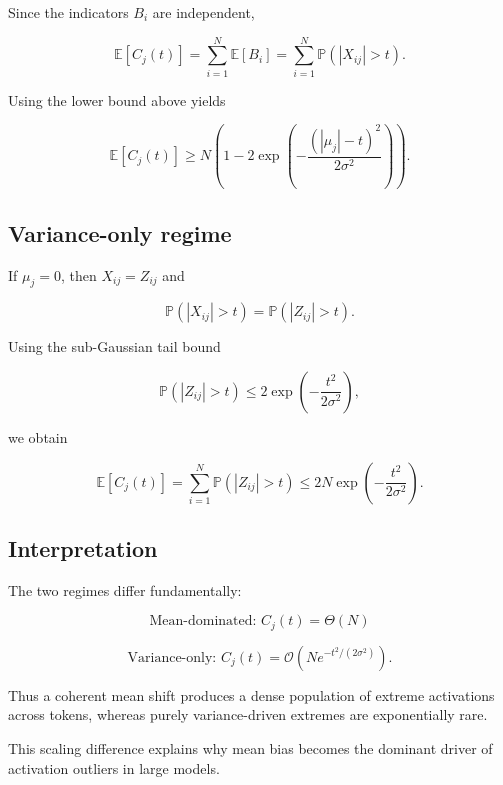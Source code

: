 Since the indicators $B_i$ are independent,

\[
\mathbb{E}[C_j(t)]
=
\sum_{i=1}^{N} \mathbb{E}[B_i]
=
\sum_{i=1}^{N} \mathbb{P}(|X_{ij}| > t).
\]

Using the lower bound above yields

\[
\mathbb{E}[C_j(t)]
\ge
N\left(1 - 2\exp\!\left(-\frac{(|\mu_j|-t)^2}{2\sigma^2}\right)\right).
\]

\subsection{Variance-only regime}

If $\mu_j = 0$, then $X_{ij} = Z_{ij}$ and

\[
\mathbb{P}(|X_{ij}| > t)
=
\mathbb{P}(|Z_{ij}| > t).
\]

Using the sub-Gaussian tail bound

\[
\mathbb{P}(|Z_{ij}| > t)
\le
2\exp\!\left(-\frac{t^2}{2\sigma^2}\right),
\]

we obtain

\[
\mathbb{E}[C_j(t)]
=
\sum_{i=1}^{N} \mathbb{P}(|Z_{ij}| > t)
\le
2N\exp\!\left(-\frac{t^2}{2\sigma^2}\right).
\]

\subsection{Interpretation}

The two regimes differ fundamentally:

\[
\text{Mean-dominated: } C_j(t) = \Theta(N)
\]

\[
\text{Variance-only: } C_j(t) = \mathcal{O}\!\left(N e^{-t^2/(2\sigma^2)}\right).
\]

Thus a coherent mean shift produces a dense population of extreme activations across tokens, whereas purely variance-driven extremes are exponentially rare.

This scaling difference explains why mean bias becomes the dominant driver of activation outliers in large models.